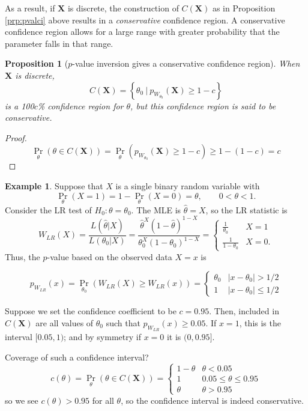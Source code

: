 \documentclass[
]{book}
\newcommand{\bX}{{\boldsymbol X}}
\newtheorem{proposition}{Proposition}[chapter]
\theoremstyle{definition}
\theoremstyle{definition}
\newtheorem{example}{Example}[chapter]
\theoremstyle{definition}
\theoremstyle{definition}
\theoremstyle{remark}
\begin{document}
As a result, if \(\bX\) is discrete, the construction of \(C(\bX)\) as in Proposition \ref{prp:pvalci} above results in a \emph{conservative} confidence region.
A conservative confidence region allows for a large range with greater probability that the parameter falls in that range.

\begin{proposition}[\(p\)-value inversion gives a conservative confidence region]
\protect\hypertarget{prp:pvalci2}{}\label{prp:pvalci2}When \(\bX\) is discrete,
\[
C(\bX) = \left\{\theta_0 \ \Big| \ p_{W_{\theta_0}}(\bX) \geq 1 - c \right\}
\]
is a 100\(c\)\% confidence region for \(\theta\), but this confidence region is said to be \emph{conservative}.
\end{proposition}

\begin{proof}
\[
\Pr_\theta \left(\theta \in C(\bX) \right) = \Pr_\theta \left(p_{W_{\theta_0}}(\bX) \geq 1 - c \right) \geq 1 - (1-c) = c
\]
\end{proof}

\begin{example}
Suppose that \(X\) is a single binary random variable with
\[
\Pr_\theta(X = 1) = 1 - \Pr_\theta(X = 0) = \theta, \hspace{2em} 0<\theta < 1.
\]
Consider the LR test of \(H_0:\theta =\theta_0\). The MLE is \(\hat\theta=X\), so the LR statistic is
\[
W_{LR}(X) = \frac{L(\hat\theta|X)}{L(\theta_0|X)} = \frac{\hat\theta^X(1-\hat\theta)^{1-X}}{\theta_0^X(1-\theta_0)^{1-X}}  = \begin{cases}
\frac{1}{\theta_0} &X =1 \\
\frac{1}{1-\theta_0} & X=0.
\end{cases}
\]
Thus, the \(p\)-value based on the observed data \(X=x\) is

\[
p_{W_{LR}}(x) = \Pr_{\theta_0}\left(W_{LR}(X) \geq W_{LR}(x) \right) = \begin{cases}
\theta_0 &|x-\theta_0|>1/2 \\
1&|x-\theta_0|\leq 1/2
\end{cases}
\]

Suppose we set the confidence coefficient to be \(c=0.95\). Then, included in \(C(\bX)\) are all values of \(\theta_0\) such that \(p_{W_{LR}}(x)\geq 0.05\).
If \(x=1\), this is the interval \([0.05,1)\); and by symmetry if \(x=0\) it is \((0,0.95]\).

Coverage of such a confidence interval?
\[
c(\theta) = \Pr_\theta(\theta\in C(\bX)) = \begin{cases}
1- \theta  &\theta < 0.05\\
1 &0.05 \leq \theta \leq 0.95\\
\theta & \theta > 0.95
\end{cases}
\]
so we see \(c(\theta)>0.95\) for all \(\theta\), so the confidence interval is indeed conservative.
\end{example}
\end{document}
